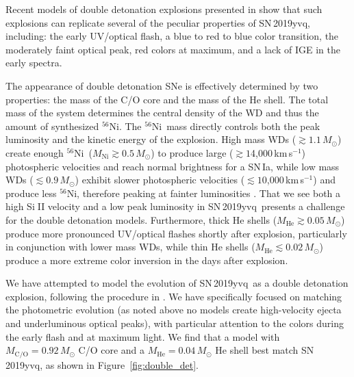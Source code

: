 \documentclass[twocolumn]{aastex63}
\def\ion#1#2{#1$\;${\footnotesize\rm{#2}}\relax}
\newcommand{\kms}{km\,s$^{-1}$}
\newcommand{\radni}{$^{56}$Ni}
\newcommand{\sn}{SN\,2019yvq}
\begin{document}
Recent models of double detonation explosions presented in \citet{Polin19}
show that such explosions can replicate several of the peculiar properties of
\sn, including: the early UV/optical flash, a blue to red to blue color
transition, the moderately faint optical peak, red colors at maximum, and a
lack of IGE in the early spectra.

The appearance of double detonation SNe is effectively determined by two
properties: the mass of the C/O core and the mass of the He shell. The total
mass of the system determines the central density of the WD and thus the
amount of synthesized \radni. The \radni\ mass directly controls both the peak
luminosity and the kinetic energy of the explosion. High mass WDs ($\gtrsim
1.1\,M_\odot$) create enough \radni\ ($M_\mathrm{Ni} \gtrsim 0.5\,M_\odot$) to
produce large ($\gtrsim 1$4,000\,\kms) photospheric velocities and reach
normal brightness for a SN\,Ia, while low mass WDs ($\lesssim 0.9\,M_\odot$)
exhibit slower photospheric velocities ($\lesssim 1$0,000\,\kms) and produce
less \radni, therefore peaking at fainter luminosities \citep{Polin19}. That
we see both a high \ion{Si}{II} velocity and a low peak luminosity in \sn\
presents a challenge for the \citet{Polin19} double detonation models.
Furthermore, thick He shells ($M_\mathrm{He} \gtrsim 0.05\,M_\odot$) produce
more pronounced UV/optical flashes shortly after explosion, particularly in
conjunction with lower mass WDs, while thin He shells ($M_\mathrm{He} \lesssim
0.02\,M_\odot$) produce a more extreme color inversion in the days after
explosion.

We have attempted to model the evolution of \sn\ as a double detonation
explosion, following the procedure in \citet{Polin19}. We have specifically
focused on matching the photometric evolution (as noted above no models create
high-velocity ejecta and underluminous optical peaks), with particular
attention to the colors during the early flash and at maximum light. We find
that a model with $M_\mathrm{C/O} = 0.92\,M_\odot$ C/O core and a
$M_\mathrm{He} = 0.04\,M_\odot$ He shell best match \sn, as shown in
Figure~\ref{fig:double_det}.
\end{document}
